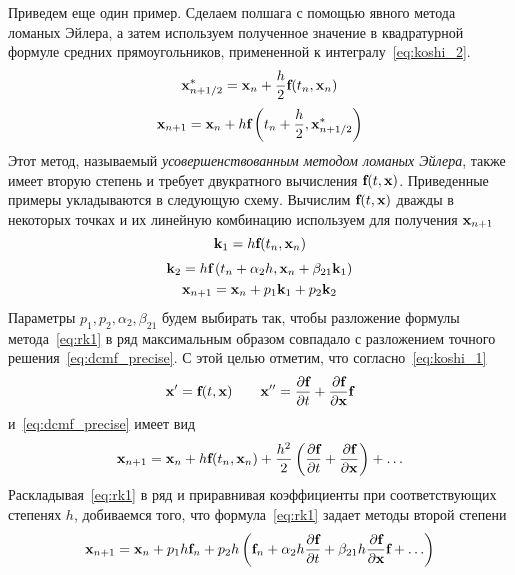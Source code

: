 \documentclass[../../calc-math-exam-2023.tex]{subfiles}
\begin{document}
    Приведем еще один пример. Сделаем полшага с помощью явного метода ломаных Эйлера, а затем используем полученное
    значение в квадратурной формуле средних прямоугольников, примененной к интегралу~\eqref{eq:koshi_2}.
    \begin{equation}
        \bf{x}_{n+1/2}^* = \bf{x}_n + \frac{h}{2}\bf{f}(t_n, \bf{x}_n)
    \end{equation}
    \begin{equation*}
        \bf{x}_{n+1} = \bf{x}_n + h\bf{f}\left( t_n + \frac{h}{2}, \bf{x}_{n+1/2}^* \right)
    \end{equation*}
    Этот метод, называемый \emph{усовершенствованным методом ломаных Эйлера}, также имеет вторую степень и требует
    двукратного вычисления $\bf{f}(t, \bf{x})$. Приведенные примеры укладываются в следующую схему. Вычислим
    $\bf{f}(t, \bf{x})$ дважды в некоторых точках и их линейную комбинацию используем для получения $\bf{x}_{n+1}$
    \begin{equation}
        \bf{k}_1 = h\bf{f}(t_n, \bf{x}_n) \label{eq:rk1}
    \end{equation}
    \begin{gather*}
        \bf{k}_2 = h\bf{f}\left( t_n + \alpha_2 h, \bf{x}_n + \beta_{21} \bf{k}_1 \right) \\
        \bf{x}_{n+1} = \bf{x}_n + p_1 \bf{k}_1 + p_2 \bf{k}_2
    \end{gather*}
    Параметры $p_1, p_2, \alpha_2, \beta_{21}$ будем выбирать так, чтобы разложение формулы метода~\eqref{eq:rk1} в ряд
    максимальным образом совпадало с разложением точного решения~\eqref{eq:dcmf_precise}. С этой целью отметим, что
    согласно~\eqref{eq:koshi_1}
    \begin{equation*}
        \bf{x}' = \bf{f}(t, \bf{x}) \qquad \bf{x}'' = \frac{\partial \bf{f}}{\partial t} + \frac{\partial \bf{f}}{\partial \bf{x}}\bf{f}    
    \end{equation*}
    и~\eqref{eq:dcmf_precise} имеет вид
    \begin{equation*}
        \bf{x}_{n+1} = \bf{x}_n + h\bf{f}(t_n, \bf{x}_n) + \frac{h^2}{2}\left( \frac{\partial \bf{f}}{\partial t} + \frac{\partial \bf{f}}{\partial \bf{x}} \right) + \ldots
    \end{equation*}
    Раскладывая~\eqref{eq:rk1} в ряд и приравнивая коэффициенты при соответствующих степенях $h$, добиваемся того, что
    формула~\eqref{eq:rk1} задает методы второй степени
    \begin{equation*}
        \bf{x}_{n+1} = \bf{x}_n + p_1 h \bf{f}_n + p_2 h\left( \bf{f}_n + \alpha_2 h \frac{\partial \bf{f}}{\partial t} + \beta_{21} h \frac{\partial \bf{f}}{\partial \bf{x}}\bf{f} + \ldots \right)
    \end{equation*}
\end{document}
